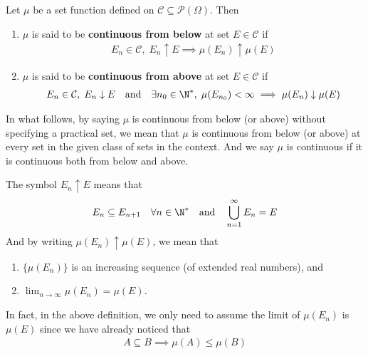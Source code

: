 \documentclass[thmcnt=section, 12pt, color=purple]{my-elegantbook}
\begin{document}

\begin{definition} \label{def:7}
	Let $\mu$ be a set function
	defined on $\mathcal{C} \subseteq \mathcal{P}(\Omega)$.
	Then
	\begin{enumerate}
		\item $\mu$ is said to 
			be \textbf{continuous from below}
			at set $E \in \mathcal{C}$ if
			\begin{align*}
				E_n \in \mathcal{C}, \; E_n \uparrow E
				\implies
				\mu(E_n) \uparrow \mu(E)
			\end{align*}
		\item $\mu$ is said to 
			be \textbf{continuous from above}
			at set $E \in \mathcal{C}$ if
			\begin{align*}
				E_n \in \mathcal{C}, \; E_n \downarrow E
				\quad \text{and} \quad
				\exists n_0 \in \N^\ast, \;
				\mu(E_{n_{0}}) < \infty
				\implies
				\mu(E_n) \downarrow \mu(E)
			\end{align*}
	\end{enumerate}
\end{definition}

\begin{note}
	In what follows, by saying $\mu$ is continuous from below (or above)
	without specifying a practical set, 
	we mean that $\mu$ is continuous from below (or above) at every set
	in the given class of sets in the context.
	And we say $\mu$ is continuous if it is continuous 
	both from below and above.
\end{note}

The symbol $E_n \uparrow E$ means that
\begin{align*}
	E_n \subseteq E_{n+1} 
	\quad \forall n \in \N^\ast
	\quad \text{and} \quad
	\bigcup_{n = 1}^\infty E_n = E
\end{align*}
And by writing $\mu(E_n) \uparrow \mu(E)$,
we mean that 
\begin{enumerate}
	\item $\{\mu(E_n)\}$ is an increasing sequence 
		(of extended real numbers), and 
	\item $\lim_{n \to \infty} \mu(E_n) = \mu(E)$.
\end{enumerate}
In fact, in the above definition, we only need to assume 
the limit of $\mu(E_n)$ is $\mu(E)$
since we have already noticed that 
\begin{align*}
	A \subseteq B  \implies \mu(A) \leq \mu(B)
\end{align*}
\end{document}
